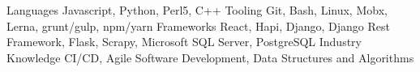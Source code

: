 
\begin{cvskills}
  \cvskill
    {Languages} %
    {Javascript, Python, Perl5, C++} %
  \cvskill
    {Tooling}
    {Git, Bash, Linux, Mobx, Lerna, grunt/gulp, npm/yarn}
  \cvskill
    {Frameworks} %
    {React, Hapi, Django, Django Rest Framework, Flask, Scrapy, Microsoft SQL Server, PostgreSQL} %
  \cvskill
    {Industry Knowledge}
    {CI/CD, Agile Software Development, Data Structures and Algorithms}
\end{cvskills}
